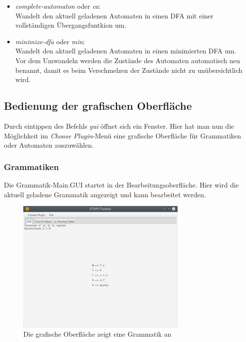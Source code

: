 \begin{itemize}
\begin{itemize}
		\item \textit{complete-automaton} oder \textit{ca}:\\
		Wandelt den aktuell geladenen Automaten in einen DFA mit einer vollständigen Übergangsfuntkion um.
		\item \textit{minimize-dfa} oder \textit{min}:\\
		Wandelt den aktuell geladenen Automaten in einen minimierten DFA um. Vor dem Umwandeln werden die Zustände des Automaten automatisch neu benannt, damit es beim Verschmelzen der Zustände nicht zu unübersichtlich wird.
	\end{itemize}
\end{itemize}
\subsection{Bedienung der grafischen Oberfläche}
\label{sec:2.4}
Durch eintippen des Befehls \textit{gui} öffnet sich ein Fenster. Hier hat man nun die Möglichkeit im \textit{Choose Plugin}-Menü eine grafische Oberfläche für Grammatiken oder Automaten auszuwählen.
\subsubsection{Grammatiken}
\label{sec:2.4.1}
Die Grammatik-Main.GUI startet in der Bearbeitungsoberfläche. Hier wird die aktuell geladene Grammatik angezeigt und kann bearbeitet werden.
\begin{figure}[H]
	\centering
	\includegraphics[width=0.75\textwidth]{bilder/gui1.png}
	\caption{Die grafische Oberfläche zeigt eine Grammatik an}
	\label{fig:pic4}
\end{figure}
